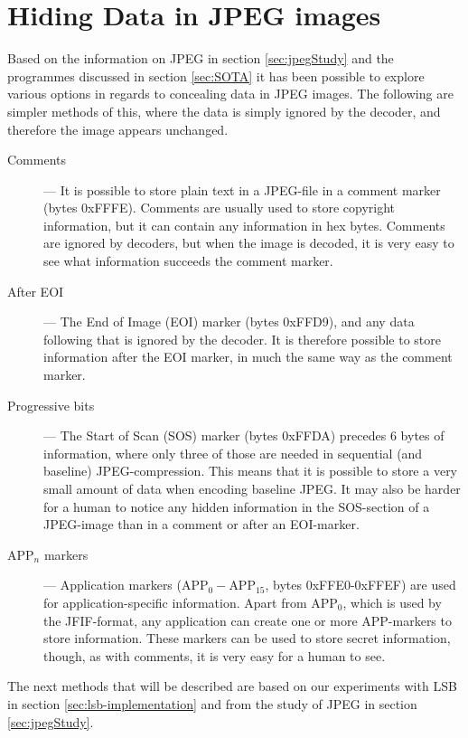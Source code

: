 
\section{Hiding Data in JPEG images}

Based on the information on JPEG in section \ref{sec:jpegStudy} and the programmes discussed in section \ref{sec:SOTA} it has been possible to explore various options in regards to concealing data in JPEG images.
The following are simpler methods of this, where the data is simply ignored by the decoder, and therefore the image appears unchanged.

\begin{description}
	\item[Comments] ---
	It is possible to store plain text in a JPEG-file in a comment marker (bytes 0xFFFE).
	Comments are usually used to store copyright information, but it can contain any information in hex bytes.
	Comments are ignored by decoders, but when the image is decoded, it is very easy to see what information succeeds the comment marker.

	\item[After EOI] ---
	The End of Image (EOI) marker (bytes 0xFFD9), and any data following that is ignored by the decoder.
	It is therefore possible to store information after the EOI marker, in much the same way as the comment marker.

	\item[Progressive bits]	---
	The Start of Scan (SOS) marker (bytes 0xFFDA) precedes 6 bytes of information, where only three of those are needed in sequential (and baseline) JPEG-compression.
	This means that it is possible to store a very small amount of data when encoding baseline JPEG.
	It may also be harder for a human to notice any hidden information in the SOS-section of a JPEG-image than in a comment or after an EOI-marker.

	\item[APP$_n$ markers] ---
	Application markers (APP$_0-$APP$_{15}$, bytes 0xFFE0-0xFFEF) are used for application-specific information.
	Apart from APP$_0$, which is used by the JFIF-format, any application can create one or more APP-markers to store information.
	These markers can be used to store secret information, though, as with comments, it is very easy for a human to see.
\end{description}

\noindent The next methods that will be described are based on our experiments with LSB in section \ref{sec:lsb-implementation} and from the study of JPEG in section \ref{sec:jpegStudy}.

